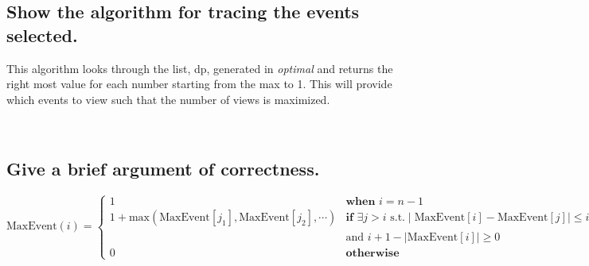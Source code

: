 \documentclass[11pt]{scrartcl}
\begin{document}
	\subsection{
		Show the algorithm for tracing the events selected.
	}
	This algorithm looks through the list, dp, generated in \textit{optimal} and returns the
	right most value for each number starting from the max to 1. This will provide which
	events to view such that the number of views is maximized.
	\begin{algorithm}
	\end{algorithm}\-\\



	\subsection{
		Give a brief argument of correctness.
	}

	\[
		\text{MaxEvent}(i)=
		\begin{cases}
			1 & \textbf{when } i = n - 1                                                                           \\
			1 + \text{max}(\text{MaxEvent}[j_1], \text{MaxEvent}[j_2], \cdots )
			  & \textbf{if } \exists j > i \text{ s.t.} \mid \text{MaxEvent}[i]-\text{MaxEvent}[j] \mid \leq i - j \\
			  & \text{and } i + 1 - \mid \text{MaxEvent}[i] \mid  \geq 0                                           \\
			0 & \textbf{otherwise}
		\end{cases}
	\]
\end{document}
